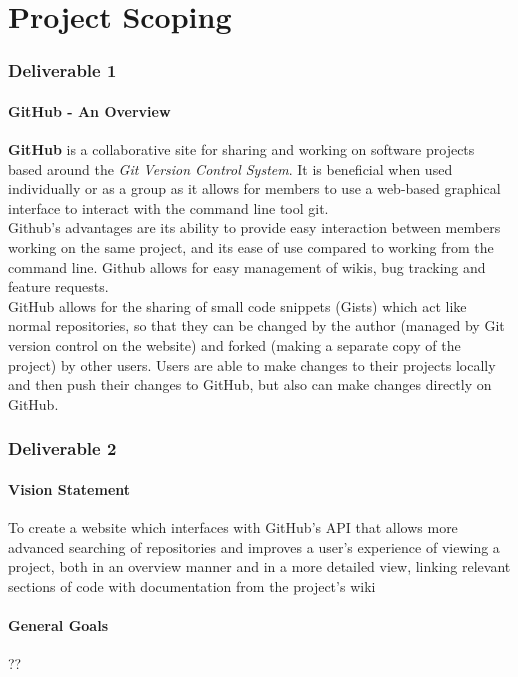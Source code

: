 \documentclass[12pt]{article}
\begin{document}
\part{Project Scoping}
\setcounter{section}{1}
\setcounter{subsection}{0}
\section*{Deliverable 1}
\subsection{GitHub - An Overview}
\textbf{GitHub} is a collaborative site for sharing and working on software projects based around the \textit{Git Version Control System}. It is beneficial when used individually or as a group as it allows for members to use a web-based graphical interface to interact with the command line tool git.\\ 

\noindent Github's advantages are its ability to provide easy interaction between members working on the same project, and its ease of use compared to working from the command line. Github allows for easy management of wikis, bug tracking and feature requests.\\

\noindent GitHub allows for the sharing of small code snippets (Gists) which act like normal repositories, so that they can be changed by the author (managed by Git version control on the website) and forked (making a separate copy of the project) by other users. Users are able to make changes to their projects locally and then push their changes to GitHub, but also can make changes directly on GitHub.

\vfill
\setcounter{section}{2}
\setcounter{subsection}{0}
\section*{Deliverable 2}
\subsection{Vision Statement}
To create a website which interfaces with GitHub's API that allows more advanced searching of repositories and improves a user's experience of viewing a project, both in an overview manner and in a more detailed view, linking relevant sections of code with documentation from the project's wiki
\subsection{General Goals}
??
\end{document}
